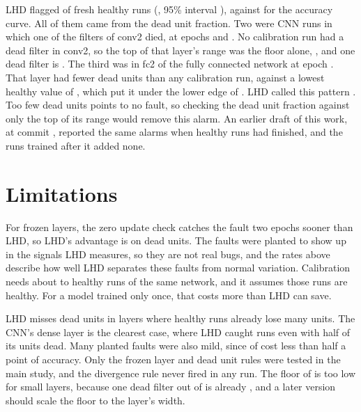 \documentclass[11pt]{article}
\newcommand{\commitref}[1]{\href{https://github.com/sohan-bhat/lhd/commit/#1}{\texttt{#1}}}
\begin{document}
LHD flagged \lhdFalseAlarms{} of \lhdHealthyRuns{} fresh healthy runs (\lhdFalseAlarmRate{}, 95\% interval \lhdFalseAlarmInterval{}), against \lhdAccFalseAlarms{} for the accuracy curve. All of them came from the dead unit fraction. Two were CNN runs in which one of the \lhdSmallLayerUnits{} filters of conv2 died, at epochs \lhdAlarmCEpoch{} and \lhdAlarmBEpoch{}. No calibration run had a dead filter in conv2, so the top of that layer's range was the floor alone, \lhdAlarmBBound{}, and one dead filter is \lhdOneUnitShare{}. The third was in fc2 of the fully connected network at epoch \lhdAlarmAEpoch{}. That layer had fewer dead units than any calibration run, \lhdAlarmAValue{} against a lowest healthy value of \lhdAlarmAEdge{}, which put it under the lower edge of \lhdAlarmABound{}. LHD called this pattern \lhdAlarmACause{}. Too few dead units points to no fault, so checking the dead unit fraction against only the top of its range would remove this alarm. An earlier draft of this work, at commit \commitref{\lhdDraftCommit}, reported the same \lhdDraftAlarms{} alarms when \lhdDraftFresh{} healthy runs had finished, and the \lhdLaterFresh{} runs trained after it added none.

\section{Limitations}
\label{sec:limits}

For frozen layers, the zero update check catches the fault two epochs sooner than LHD, so LHD's advantage is on dead units. The faults were planted to show up in the signals LHD measures, so they are not real bugs, and the rates above describe how well LHD separates these faults from normal variation. Calibration needs about \lhdCalDRuns{} to \lhdCalFRuns{} healthy runs of the same network, and it assumes those runs are healthy. For a model trained only once, that costs more than LHD can save.

LHD misses dead units in layers where healthy runs already lose many units. The CNN's dense layer is the clearest case, where LHD caught \lhdCnnDenseCCaught{} runs even with half of its units dead. Many planted faults were also mild, since \lhdHarmSmall{} of \lhdBrokenRuns{} cost less than half a point of accuracy. Only the frozen layer and dead unit rules were tested in the main study, and the divergence rule never fired in any run. The floor of \lhdFloor{} is too low for small layers, because one dead filter out of \lhdSmallLayerUnits{} is already \lhdOneUnitShare{}, and a later version should scale the floor to the layer's width.
\end{document}
